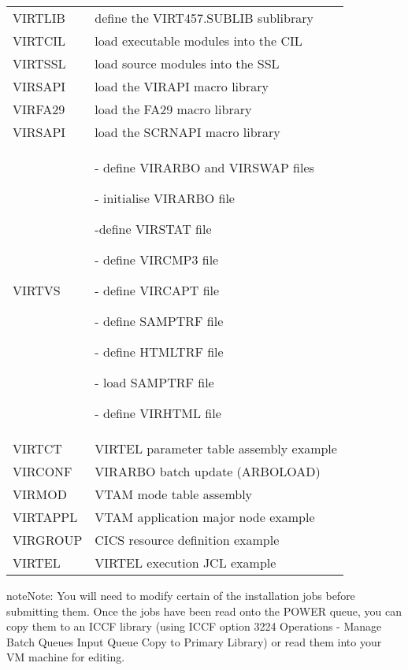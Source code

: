 \documentclass[letterpaper,10pt,english]{sphinxmanual}
\begin{document}
\begin{savenotes}\sphinxattablestart
\centering
\begin{tabulary}{\linewidth}[t]{|T|T|}
\hline
{}\relax &\relax \\
\hline
VIRTLIB
&
define the VIRT457.SUBLIB sublibrary
\\
\hline
VIRTCIL
&
load executable modules into the CIL
\\
\hline
VIRTSSL
&
load source modules into the SSL
\\
\hline
VIRSAPI
&
load the VIRAPI macro library
\\
\hline
VIRFA29
&
load the FA29 macro library
\\
\hline
VIRSAPI
&
load the SCRNAPI macro library
\\
\hline
VIRTVS
& - define VIRARBO and VIRSWAP files

 - initialise VIRARBO file

 -define VIRSTAT file

 - define VIRCMP3 file

 - define VIRCAPT file

 - define SAMPTRF file

 - define HTMLTRF file

 - load SAMPTRF file

 - define VIRHTML file
\\
\hline
VIRTCT
&
VIRTEL parameter table assembly example
\\
\hline
VIRCONF
&
VIRARBO batch update (ARBOLOAD)
\\
\hline
VIRMOD
&
VTAM mode table assembly
\\
\hline
VIRTAPPL
&
VTAM application major node example
\\
\hline
VIRGROUP
&
CICS resource definition example
\\
\hline
VIRTEL
&
VIRTEL execution JCL example
\\
\hline
\end{tabulary}
\par
\sphinxattableend\end{savenotes}

\begin{sphinxadmonition}{note}{Note:}
You will need to modify certain of the installation jobs before submitting them. Once the jobs have been read onto the POWER queue, you can copy them to an ICCF library (using ICCF option 3224 Operations - Manage Batch Queues \textendash{} Input Queue \textendash{} Copy to Primary Library) or read them into your VM machine for editing.
\end{sphinxadmonition}
\end{document}
